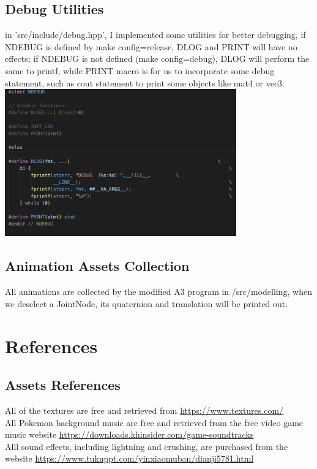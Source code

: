 \documentclass {article}
\begin{document}
\subsection{Debug Utilities}
in 'src/include/debug.hpp', I implemented some utilities for better debugging, if NDEBUG is defined by make config=release, 
DLOG and PRINT will have no effects; if NDEBUG is not defined (make config=debug), DLOG will perform the same to printf, while PRINT macro is for us to 
incorporate some debug statement, such as cout statement to print some objects like mat4 or vec3.\\
\includegraphics[width=100mm]{debug_code.png}
\subsection{Animation Assets Collection}
All animations are collected by the modified A3 program in /src/modelling, when we deselect a JointNode, its quaternion and translation will be printed out.


\newpage
\section{References}
\subsection{Assets References}
    All of the textures are free and retrieved from \url{https://www.textures.com/} \\
    All Pokemon background music are free and retrieved from the free video game music website \url{https://downloads.khinsider.com/game-soundtracks} \\
    Alll sound effects, including lightning and crushing, are purchased from the website \url{https://www.tukuppt.com/yinxiaomuban/dianji5781.html}
\end{document}
